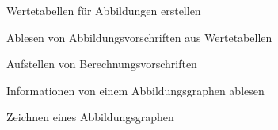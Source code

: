 \documentclass[../funktionen.tex]{subfiles}
\begin{document}
\begin{solution}
\begin{enumerate}
\begin{center}
            \end{center}
        \end{enumerate}
    \end{solution}

    \begin{sampleexercise}{Wertetabellen für Abbildungen erstellen}
        
    \end{sampleexercise}
    
    \begin{sampleexercise}{Ablesen von Abbildungsvorschriften aus Wertetabellen}
        
    \end{sampleexercise}
    
    \begin{sampleexercise}{Aufstellen von Berechnungsvorschriften}
        
    \end{sampleexercise}

    \begin{sampleexercise}{Informationen von einem Abbildungsgraphen ablesen}
        
    \end{sampleexercise}
    
    \begin{sampleexercise}{Zeichnen eines Abbildungsgraphen}
        
    \end{sampleexercise}
\end{document}
